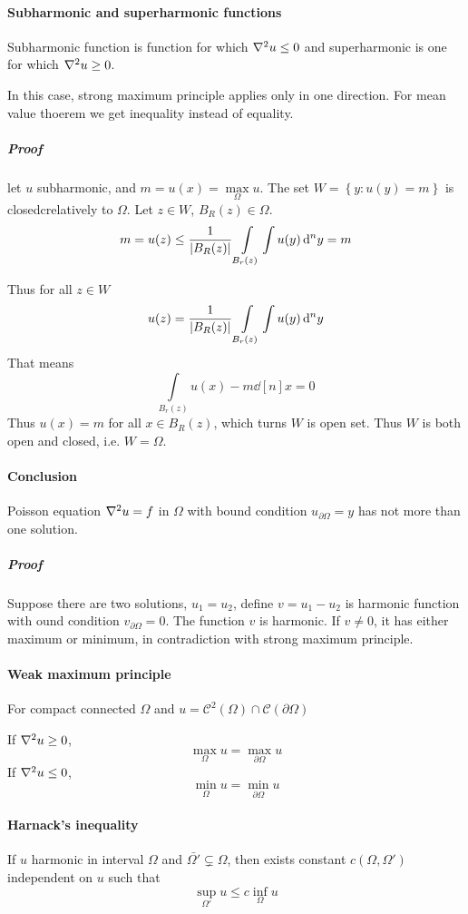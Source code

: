 	\paragraph{Subharmonic and superharmonic functions}
	Subharmonic function is function for which $\laplacian{u}\leq 0$ and superharmonic is one for which $\laplacian{u}\geq0$.
	
	In this case, strong maximum principle applies only in one direction. For mean value thoerem we get inequality instead of equality.
	
	\subparagraph{Proof}
	let $u$ subharmonic, and $m = u(x) = \max\limits_{\Omega} u$.
	The set $W= \left\{ y: u(y)=m \right\} $ is closedcrelatively to $\Omega$.
	Let $z\in W$, $B_R(z) \in \Omega$.
	$$m = u(z) \leq \frac{1}{\abs{B_R(z)}} \int\limits_{B_r(z)} \int u(y) \dd[n]{y} = m$$
	
	Thus for all $z\in W$
	$$u(z) = \frac{1}{\abs{B_R(z)}} \int\limits_{B_r(z)} \int u(y) \dd[n]{y}$$
	That means
	$$\int\limits_{B_r(z)} u(x) - m \dd[n]{x}= 0$$
	Thus $u(x) = m$ for all $x\in B_R(z)$, which turns $W$ is open set. Thus $W$ is both open and closed, i.e. $W=\Omega$.
	
	\paragraph{Conclusion}
	Poisson equation $\laplacian{u} = f$ in $\Omega$ with bound condition $u_{\partial \Omega} = y$ has not more than one solution.
	\subparagraph{Proof}
	Suppose there are two solutions, $u_1=u_2$, define $v=u_1-u_2$ is harmonic function with ound condition  $v_{\partial \Omega} = 0$. The function $v$ is harmonic. If $v\neq 0$, it has either maximum or minimum, in contradiction with strong maximum principle.
	
	\paragraph{Weak maximum principle}
	For compact connected $\Omega$ and $u = \mathcal{C}^2(\Omega) \cap \mathcal{C}(\partial \Omega)$ 
	
	If $\laplacian{u} \geq 0$, 
	$$\max\limits_{\Omega} u = \max\limits_{\partial \Omega} u$$
	If $\laplacian{u} \leq 0$, 
	$$\min\limits_{\Omega} u = \min\limits_{\partial \Omega} u$$
	\paragraph{Harnack's inequality}
	If $u$ harmonic in interval $\Omega$ and $\bar{\Omega'} \subsetneq \Omega$, then exists constant $c(\Omega, \Omega')$ independent on $u$ such that
	$$\sup\limits_{\Omega'} u \leq c \inf\limits_{\Omega} u$$